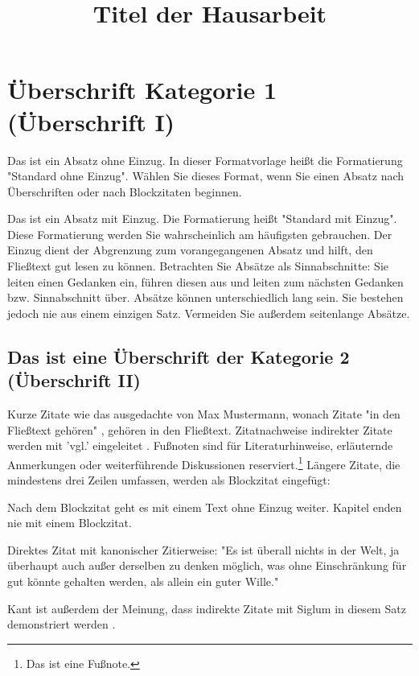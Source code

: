 \documentclass{hausarbeit_philosophie}
\title{Titel der Hausarbeit}
\begin{document}
\maketitle
\tableofcontents
\newpage

\section{Überschrift Kategorie 1 (Überschrift I)}
Das ist ein Absatz ohne Einzug. In dieser Formatvorlage heißt die Formatierung "Standard ohne Einzug". Wählen Sie dieses Format, wenn Sie einen Absatz nach Überschriften oder nach Blockzitaten beginnen.

Das ist ein Absatz mit Einzug. Die Formatierung heißt "Standard mit Einzug". Diese Formatierung werden Sie wahrscheinlich am häufigsten gebrauchen. Der Einzug dient der Abgrenzung zum vorangegangenen Absatz und hilft, den Fließtext gut lesen zu können. Betrachten Sie Absätze als Sinnabschnitte: Sie leiten einen Gedanken ein, führen diesen aus und leiten zum nächsten Gedanken bzw. Sinnabschnitt über. Absätze können unterschiedlich lang sein. Sie bestehen jedoch nie aus einem einzigen Satz. Vermeiden Sie außerdem seitenlange Absätze.

\subsection{Das ist eine Überschrift der Kategorie 2 (Überschrift II)}
Kurze Zitate wie das ausgedachte von Max Mustermann, wonach Zitate "in den Fließtext gehören" \cite[14]{MusZit}, gehören in den Fließtext. Zitatnachweise indirekter Zitate werden mit 'vgl.' eingeleitet . Fußnoten sind für Literaturhinweise, erläuternde Anmerkungen oder weiterführende Diskussionen reserviert.\footnote{Das ist eine Fußnote.} Längere Zitate, die mindestens drei Zeilen umfassen, werden als Blockzitat eingefügt:


Nach dem Blockzitat geht es mit einem Text ohne Einzug weiter. Kapitel enden nie mit einem Blockzitat.

Direktes Zitat mit kanonischer Zitierweise: "Es ist überall nichts in der Welt, ja überhaupt auch außer derselben zu denken möglich, was ohne Einschränkung für gut könnte gehalten werden, als allein ein guter Wille." \cite[393]{GMS}

Kant ist außerdem der Meinung, dass indirekte Zitate mit Siglum in diesem Satz demonstriert werden .

\printbibliography
\end{document}
